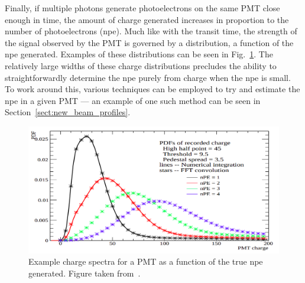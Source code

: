 Finally, if multiple photons generate photoelectrons on the same PMT close enough in time, the amount of charge generated increases in proportion to the number of photoelectrons (npe). Much like with the transit time, the strength of the signal observed by the PMT is governed by a distribution, a function of the npe generated. Examples of these distributions can be seen in Fig.~\ref{fig:charge_dists_pmt}. %
The relatively large widths of these charge distributions precludes the ability to straightforwardly determine the npe purely from charge when the npe is small. To work around this, various techniques can be employed to try and estimate the npe in a given PMT --- an example of one such method can be seen in Section~\ref{sect:new_beam_profiles}.

\begin{figure}
    \centering
    \includegraphics[width=0.8\linewidth]{2_Detector/Figs/charge_spectra.png}
    \caption[Example charge spectra for a PMT as a function of the true npe generated]{Example charge spectra for a PMT as a function of the true npe generated. Figure taken from~\cite{dungerOccupancyAnalysisMultipleHit2016}. %
    }
    \label{fig:charge_dists_pmt}
\end{figure}


